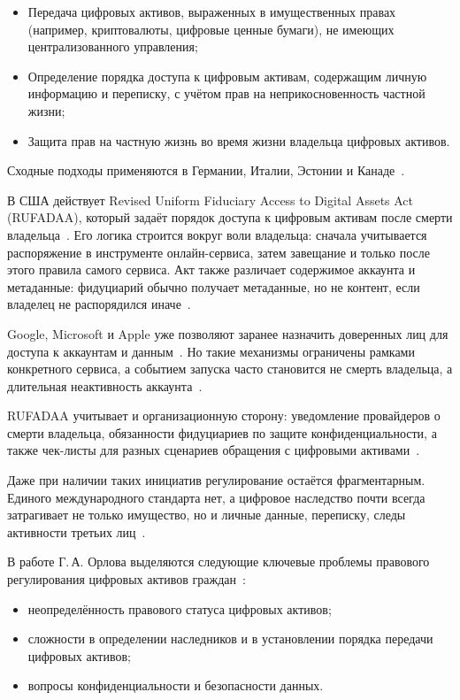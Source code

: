 \begin{itemize}
  \item Передача цифровых активов, выраженных в имущественных правах (например, криптовалюты, цифровые ценные бумаги), не имеющих централизованного управления;
  \item Определение порядка доступа к цифровым активам, содержащим личную информацию и переписку, с учётом прав на неприкосновенность частной жизни;
  \item Защита прав на частную жизнь во время жизни владельца цифровых активов.
\end{itemize}

Сходные подходы применяются в Германии, Италии, Эстонии и Канаде~\cite{bghIIIzr18317_2018, Harbinja2022DigitalDeath}.

В США действует Revised Uniform Fiduciary Access to Digital Assets Act (RUFADAA), который задаёт порядок доступа к цифровым активам после смерти владельца~\cite{RUFADAA2015}. Его логика строится вокруг воли владельца: сначала учитывается распоряжение в инструменте онлайн-сервиса, затем завещание и только после этого правила самого сервиса. Акт также различает содержимое аккаунта и метаданные: фидуциарий обычно получает метаданные, но не контент, если владелец не распорядился иначе~\cite{RUFADAA2015}.

Google, Microsoft и Apple уже позволяют заранее назначить доверенных лиц для доступа к аккаунтам и данным~\cite{googleInactiveAccountManager, facebookLegacyContact, appleLegacyContact}. Но такие механизмы ограничены рамками конкретного сервиса, а событием запуска часто становится не смерть владельца, а длительная неактивность аккаунта~\cite{googleInactiveAccountManager, Orlov2024Moluch}.

RUFADAA учитывает и организационную сторону: уведомление провайдеров о смерти владельца, обязанности фидуциариев по защите конфиденциальности, а также чек-листы для разных сценариев обращения с цифровыми активами~\cite{RUFADAA2015}.

Даже при наличии таких инициатив регулирование остаётся фрагментарным. Единого международного стандарта нет, а цифровое наследство почти всегда затрагивает не только имущество, но и личные данные, переписку, следы активности третьих лиц~\cite{Haritonova2024HSE, Harbinja2022DigitalDeath}.

В работе Г.\,А. Орлова выделяются следующие ключевые проблемы правового регулирования цифровых активов граждан~\cite{Orlov2024Moluch}:

\begin{itemize}
  \item неопределённость правового статуса цифровых активов;
  \item сложности в определении наследников и в установлении порядка передачи цифровых активов;
  \item вопросы конфиденциальности и безопасности данных.
\end{itemize}

